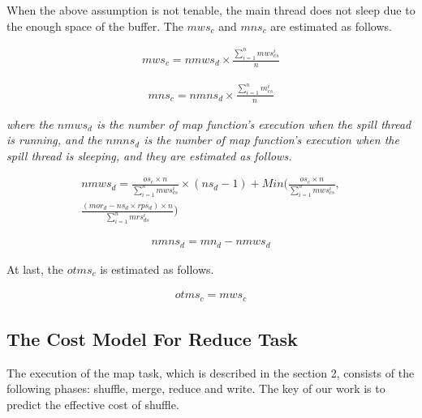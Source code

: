 When the above assumption is not tenable, the main thread does not sleep due to the enough space of the buffer. The $mws_c$ and $mns_c$ are estimated as follows.
\begin{small}
\begin{equation}
\begin{split}
mws_c=nmws_d \times\frac{\sum_{i=1}^nmws_{cs}^i}{n} \nonumber
\end{split}
\end{equation}
\end{small}
\begin{small}	
\begin{equation}
\begin{split}
mns_c=nmns_d\times \frac{\sum_{i=1}^n m_{cs}^i}{n} \nonumber
\end{split}
\end{equation}
\end{small}
\emph{where the $nmws_d$ is the number of map function's execution when the spill thread is running, and the $nmns_d$ is the number of map function's execution when the spill thread is sleeping, and they are estimated as follows.}
\begin{small}
\begin{equation}
\begin{split}
nmws_d=\frac{os_c\times n}{\sum_{i=1}^n mws_{cs}^i} \times 
(ns_d-1)+Min( \frac{os_c\times n}{\sum_{i=1}^n mws_{cs}^i} 
, \\
\frac{(mor_d-ns_d\times rps_d)\times n}{\sum_{i=1}^nmrs_{ds}^i})  \nonumber
\end{split}
\end{equation}
\end{small}
\begin{small}
\begin{equation}
\begin{split}
nmns_d=mn_d-nmws_d \nonumber
\end{split}
\end{equation}
\end{small}
At last, the $otms_c$ is estimated as follows.
\begin{small}
\begin{equation}
\begin{split}
otms_c=mws_c
\end{split}
\end{equation}
\end{small}
\subsection{The Cost Model For Reduce Task}
The execution of the map task, which is described in the section 2, consists of the following phases: shuffle, merge, reduce and write. The key of our work is to predict the effective cost of shuffle.


